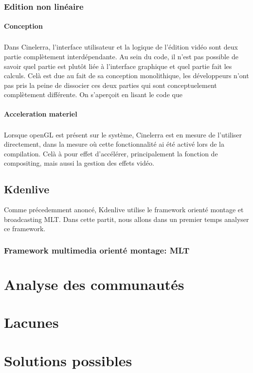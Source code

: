 \subsubsection{Edition non linéaire}

\paragraph{Conception}

\subparagraph{}

Dans Cinelerra, l'interface utilisateur et la logique de l'édition
vidéo sont deux partie complètement interdépendante. Au sein du
code, il n'est pas possible de savoir quel partie est plutôt liée à
l'interface graphique et quel partie fait les calculs. Celà est due au
fait de sa conception monolithique, les développeurs n'ont pas pris la
peine de dissocier ces deux parties qui sont conceptuelement complètement
différente. On s'aperçoit en lisant le code que

\paragraph{Acceleration materiel}

\subparagraph{}

Lorsque openGL est présent sur le système, Cinelerra
est en mesure de l'utiliser directement, dans la mesure où cette
fonctionnalité ai été activé lors de la compilation. Celà à pour
effet d'accélérer, principalement la fonction de compositing, mais
aussi la gestion des effets vidéo.

\subsection {Kdenlive}

Comme précedemment anoncé, Kdenlive utilise le framework orienté montage
et broadcasting MLT. Dans cette partit, nous allons dans un premier temps
analyser ce framework.

\subsubsection {Framework multimedia orienté montage: MLT}


\newpage \section{Analyse des communautés}

\newpage \section{Lacunes}

\newpage \section{Solutions possibles}
